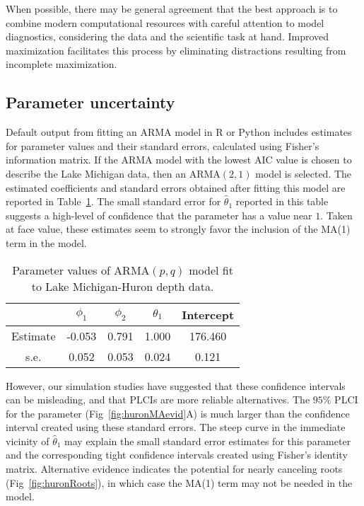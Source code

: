 When possible, there may be general agreement that the best approach is to combine modern computational resources with careful attention to model diagnostics, considering the data and the scientific task at hand.
Improved maximization facilitates this process by eliminating distractions resulting from incomplete maximization.

\subsection{Parameter uncertainty}\label{sec:HuronCI}



Default output from fitting an ARMA model in R or Python includes estimates for parameter values and their standard errors, calculated using Fisher's information matrix.
If the ARMA model with the lowest AIC value is chosen to describe the Lake Michigan data, then an $\text{ARMA}(2, 1)$ model is selected.
The estimated coefficients and standard errors obtained after fitting this model are reported in Table~\ref{tab:huronCoefsTab}.
The small standard error for $\hat{\theta}_1$ reported in this table suggests a high-level of confidence that the parameter has a value near $1$.
Taken at face value, these estimates seem to strongly favor the inclusion of the MA(1) term in the model.

\begin{table}
\centering
\caption{\label{tab:huronCoefsTab}Parameter values of $\text{ARMA}(p, q)$ model fit to Lake Michigan-Huron depth data.}
\begin{tabular}{c|c|c|c|c}\hline
 & $\phi_1$ & $\phi_2$ & $\theta_1$ & Intercept \\\hline
 Estimate & -0.053 & 0.791 & 1.000  & 176.460 \\\hline
 s.e. & 0.052 & 0.053 & 0.024  & 0.121 \\\hline
\end{tabular}
\end{table}



However, our simulation studies have suggested that these confidence intervals can be misleading, and that PLCIs are more reliable alternatives.
The $95\%$ PLCI for the parameter (Fig~\ref{fig:huronMAevid}A) is much larger than the confidence interval created using these standard errors.
The steep curve in the immediate vicinity of $\hat{\theta}_1$ may explain the small standard error estimates for this parameter and the corresponding tight confidence intervals created using Fisher's identity matrix.
Alternative evidence indicates the potential for nearly canceling roots (Fig~\ref{fig:huronRoots}), in which case the MA(1) term may not be needed in the model.








